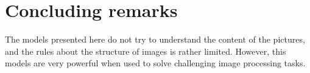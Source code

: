 

%







%
%

%
%
%
%
%
%
%
%
\section{Concluding remarks}

The models presented here do not try to understand the content of the pictures, and  the rules about the structure of images is rather limited. However, this models are very powerful when used to solve challenging image processing tasks. %


